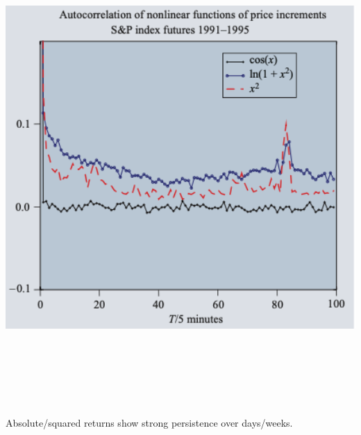 \documentclass[final]{beamer}
\begin{document}
\begin{frame}[t]
\begin{columns}[t]
\begin{column}{.48\linewidth}

\vspace{0.5cm}

\begin{tcolorbox}[mybox, title=Nonlinear Correlations]
\begin{center}
\includegraphics[width=0.95\linewidth,height=18cm,keepaspectratio]{figure8_nonlinear.png}
\end{center}
\vspace{0.3cm}
\large
Absolute/squared returns show strong persistence over days/weeks.
\end{tcolorbox}

\vspace{0.5cm}


\end{column}
\end{columns}
\end{frame}
\end{document}
